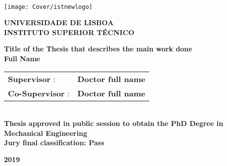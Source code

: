 \setcounter{page}{1} 


\thispagestyle{empty}
\begin{flushleft} ~\\ \vspace{-12mm} \hspace{-12mm}  \texttt{[image: Cover/istnewlogo]} 
 
\centering
\LARGE \textbf{UNIVERSIDADE DE LISBOA \\ INSTITUTO SUPERIOR TÉCNICO}
\vspace{30mm}

 \vspace{5mm}
 
\centering
\LARGE \textbf{Title of the Thesis that describes the main work done}
\\ \vspace{25mm}  %
\LARGE \textbf{Full Name} \\
\vspace{3cm}

\begin{minipage}{\textwidth}
\begin{tabularx}{\textwidth}{ l @{ } l }
\textbf{Supervisor} : & \textbf{Doctor full name}\\
\textbf{Co-Supervisor} :  & \textbf{Doctor full name}\\
\end{tabularx}

\end{minipage}
%
\\ \vspace{20mm}
\centering\LARGE
\textbf{Thesis approved in public session to obtain the PhD Degree in Mechanical Engineering}\\
\vspace{8mm}
\LARGE \textbf{Jury final classification:  Pass}\\
 
\vspace{20mm}

\LARGE \textbf{2019} \\
\let\thepage\relax
\end{flushleft}
\pagebreak
